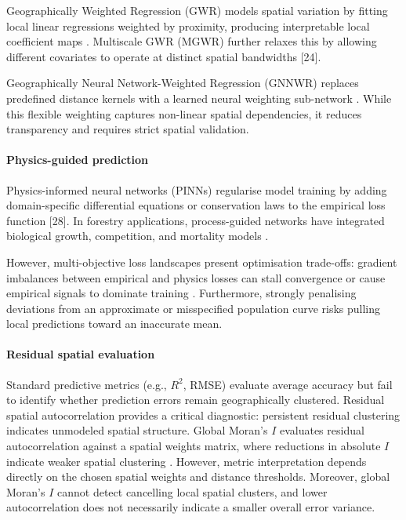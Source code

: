 \documentclass[logo,msc,ai]{infthesis}           %
\begin{document}
Geographically Weighted Regression (GWR) models spatial variation by fitting local linear regressions weighted by proximity, producing interpretable local coefficient maps \cite{brunsdon1996Geographically_C6_GWR, wheeler2005Multicollinearity_C6_GWR}. Multiscale GWR (MGWR) further relaxes this by allowing different covariates to operate at distinct spatial bandwidths [24].

Geographically Neural Network-Weighted Regression (GNNWR) replaces predefined distance kernels with a learned neural weighting sub-network \cite{du2020Geographically_C6_GWR}. While this flexible weighting captures non-linear spatial dependencies, it reduces transparency and requires strict spatial validation. 

\paragraph*{Physics-guided prediction}
Physics-informed neural networks (PINNs) regularise model training by adding domain-specific differential equations or conservation laws to the empirical loss function [28]. In forestry applications, process-guided networks have integrated biological growth, competition, and mortality models \cite{pichler2025Inferring_C4_NN}.

However, multi-objective loss landscapes present optimisation trade-offs: gradient imbalances between empirical and physics losses can stall convergence or cause empirical signals to dominate training \cite{wang2021Understanding_C4_NN}. Furthermore, strongly penalising deviations from an approximate or misspecified population curve risks pulling local predictions toward an inaccurate mean.

\paragraph*{Residual spatial evaluation}
Standard predictive metrics (e.g., $R^2$, RMSE) evaluate average accuracy but fail to identify whether prediction errors remain geographically clustered. Residual spatial autocorrelation provides a critical diagnostic: persistent residual clustering indicates unmodeled spatial structure. Global Moran's $I$ evaluates residual autocorrelation against a spatial weights matrix, where reductions in absolute $I$ indicate weaker spatial clustering \cite{moran1950Notes_c5_eval, kim2021Predicting_C5_EVAL}. However, metric interpretation depends directly on the chosen spatial weights and distance thresholds. Moreover, global Moran's $I$ cannot detect cancelling local spatial clusters, and lower autocorrelation does not necessarily indicate a smaller overall error variance.
\end{document}
